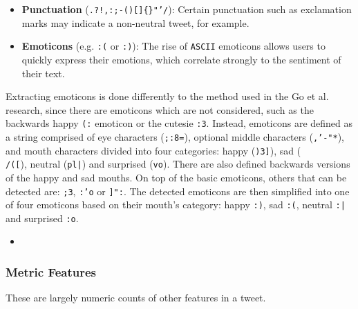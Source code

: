 \documentclass[11pt]{article}
\begin{document}
\begin{itemize}
	\item \textbf{Punctuation} (\texttt{.?!,:;-()[]\{\}"'/}): Certain punctuation such as exclamation marks may indicate a non-neutral tweet, for example.
	\item \textbf{Emoticons} (e.g. \texttt{:(} or \texttt{:)}): The rise of \texttt{ASCII} emoticons allows users to quickly express their emotions, which correlate strongly to the sentiment of their text.
\end{itemize}  

Extracting emoticons is done differently to the method used in the Go et al.  research,
since there are emoticons which are not considered, such as the backwards happy \texttt{(:} emoticon or the cutesie \texttt{:3}.
Instead, emoticons are defined as a string comprised of eye characters (\texttt{;:8=}), optional middle characters (\texttt{,'-"*}), 
and mouth characters divided into four categories: happy (\texttt{)3]}), sad (\texttt{\\/([}), neutral (\texttt{pl|}) and surprised (\texttt{vo}).
There are also defined backwards versions of the happy and sad mouths.
On top of the basic emoticons, others that can be detected are: \texttt{;3}, \texttt{:'o} or \texttt{]":}. 
The detected emoticons are then simplified into one of four emoticons based on their mouth's category: happy \texttt{:)}, sad \texttt{:(}, neutral \texttt{:|} and surprised \texttt{:o}.

\begin{itemize}
	\item \textbf{}
\end{itemize}

\subsubsection{Metric Features}

These are largely numeric counts of other features in a tweet.
\end{document}
